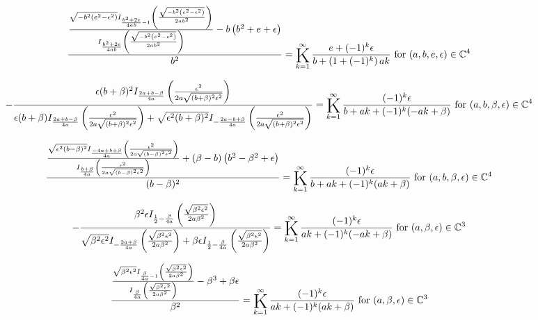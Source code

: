 \documentclass{article}
\newcommand{\bigK}{\mathop{\raisebox{-5pt}{\huge K}}}
\begin{document}
\[\frac{\frac{\sqrt{-b^2 \left(e^2-\epsilon ^2\right)} I_{\frac{b^2+2 e}{4 a b}-1}\left(\frac{\sqrt{-b^2 \left(e^2-\epsilon ^2\right)}}{2 a b^2}\right)}{I_{\frac{b^2+2 e}{4 a b}}\left(\frac{\sqrt{-b^2 \left(e^2-\epsilon ^2\right)}}{2 a b^2}\right)}-b \left(b^2+e+\epsilon \right)}{b^2}=\bigK_{k=1}^{\infty}\frac{e+(-1)^k \epsilon }{b+\left(1+(-1)^k\right) a k}\text{ for }(a,b,e,\epsilon )\in \mathbb{C}^4\] 

\[-\frac{\epsilon  (b+\beta )^2 I_{\frac{2 a+b-\beta }{4 a}}\left(\frac{\epsilon ^2}{2 a \sqrt{(b+\beta )^2 \epsilon ^2}}\right)}{\epsilon  (b+\beta ) I_{\frac{2 a+b-\beta }{4 a}}\left(\frac{\epsilon ^2}{2 a \sqrt{(b+\beta )^2 \epsilon ^2}}\right)+\sqrt{\epsilon ^2 (b+\beta )^2} I_{-\frac{2 a-b+\beta }{4 a}}\left(\frac{\epsilon ^2}{2 a \sqrt{(b+\beta )^2 \epsilon ^2}}\right)}=\bigK_{k=1}^{\infty}\frac{(-1)^k \epsilon }{b+a k+(-1)^k (-a k+\beta )}\text{ for }(a,b,\beta ,\epsilon )\in \mathbb{C}^4\] 

\[\frac{\frac{\sqrt{\epsilon ^2 (b-\beta )^2} I_{\frac{-4 a+b+\beta }{4 a}}\left(\frac{\epsilon ^2}{2 a \sqrt{(b-\beta )^2 \epsilon ^2}}\right)}{I_{\frac{b+\beta }{4 a}}\left(\frac{\epsilon ^2}{2 a \sqrt{(b-\beta )^2 \epsilon ^2}}\right)}+(\beta -b) \left(b^2-\beta ^2+\epsilon \right)}{(b-\beta )^2}=\bigK_{k=1}^{\infty}\frac{(-1)^k \epsilon }{b+a k+(-1)^k (a k+\beta )}\text{ for }(a,b,\beta ,\epsilon )\in \mathbb{C}^4\] 

\[-\frac{\beta ^2 \epsilon  I_{\frac{1}{2}-\frac{\beta }{4 a}}\left(\frac{\sqrt{\beta ^2 \epsilon ^2}}{2 a \beta ^2}\right)}{\sqrt{\beta ^2 \epsilon ^2} I_{-\frac{2 a+\beta }{4 a}}\left(\frac{\sqrt{\beta ^2 \epsilon ^2}}{2 a \beta ^2}\right)+\beta  \epsilon  I_{\frac{1}{2}-\frac{\beta }{4 a}}\left(\frac{\sqrt{\beta ^2 \epsilon ^2}}{2 a \beta ^2}\right)}=\bigK_{k=1}^{\infty}\frac{(-1)^k \epsilon }{a k+(-1)^k (-a k+\beta )}\text{ for }(a,\beta ,\epsilon )\in \mathbb{C}^3\] 

\[\frac{\frac{\sqrt{\beta ^2 \epsilon ^2} I_{\frac{\beta }{4 a}-1}\left(\frac{\sqrt{\beta ^2 \epsilon ^2}}{2 a \beta ^2}\right)}{I_{\frac{\beta }{4 a}}\left(\frac{\sqrt{\beta ^2 \epsilon ^2}}{2 a \beta ^2}\right)}-\beta ^3+\beta  \epsilon }{\beta ^2}=\bigK_{k=1}^{\infty}\frac{(-1)^k \epsilon }{a k+(-1)^k (a k+\beta )}\text{ for }(a,\beta ,\epsilon )\in \mathbb{C}^3\] 
\end{document}
